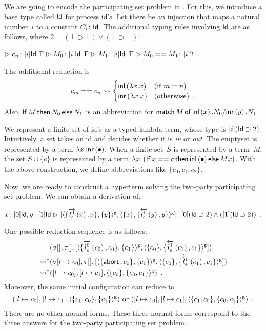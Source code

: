 {We are going to encode the participating set problem in \lgd.
For this, we introduce a base type called $\Id$ for process id's.
Let there be an injection that maps a natural number~$i$ to a constant
$C_i\colon\Id$.
The additional typing rules involving $\Id$ are as follows, where $2 = (\bot\supset\bot)\vee(\bot\supset\bot)$:
\begin{center}
 \UnaryRule{}{}
 {$\tr \tj{c_n}{[i]\Id}$}
 \hfill
 \BinaryRule
 {$\Gamma\tr \tj{M_0}[i]\Id$}
 {$\Gamma\tr \tj{M_1}[i]\Id$}
 {}
 {$\Gamma \tr \tj{\compare{M_0}{M_1}}{[i]2}$}\enspace.
\end{center}
The additional reduction is
\[
 c_m == c_n \reduce
\begin{cases}
 \linl{\lambda x.x}& (\text{if } m = n)\\
 \linr{\lambda x.x}& (\text{otherwise})\enspace.
\end{cases}
\]
Also,
${\ifte M {N_0} {N_1}}$
is an abbreviation for
${\lmat M x {N_0} y {N_1}}$.

We represent a finite set of id's as a
typed lambda term, whose type is $[i](\Id\supset 2)$.  Intuitively, a
set takes an id and decides whether it is \textit{in} or \textit{out}.
The emptyset is represented by a term $\lambda x. \linr {\bullet}$.
When a finite set~$S$ is represented by a term~$M$,
the set $S \cup \{c\}$ is represented by a term
$\lambda x.\left(\ifte{x==c}{\linl {\bullet}}{Mx}\right)$.
With the above construction, we define abbreviations
like $\{c_0, c_1, c_2\}$.

Now, we are ready to construct a hyperterm solving the two-party
participating set problem.
We can  obtain a derivation of:
\begin{center}
 \small
$
 \tj{x}{[0]\Id},
 \tj{y}{[1]\Id}
 \tr
 \tj{\cotuple{\gpair{\{\ltor 0 l \epsilon x, x\}, \{y\}},
 \gpair{\{x\}, \{\rtol 1 l\epsilon y, y\}}
 }}
 {[0](\Id\supset 2)\wedge ([1](\Id\supset 2))}\enspace.$
\end{center}

One possible reduction sequence is as follows:
\begin{align*}
 & \conf{[]}{[]}
 {\cotuple{\gpair{\{\ltor 0 l \epsilon {c_0}, {c_0}\}, \{{c_1}\}},
 \gpair {\{{c_0}\}, \{\rtol 1 l\epsilon {c_1}, {c_1}\}}}} \\
 \reduction &
 \conf{[l\mapsto {c_0}]}{[]}
 {
 \cotuple{
 \gpair{\{\abort, {c_0}\}, \{{c_1}\}},
 \gpair{\{{c_0}\}, \{\rtol 1 l\epsilon {c_1}, {c_1}\}}
 }
 }
 \\
 \reduction &
 \concreteconf{[l\mapsto {c_0}]}{[l\mapsto {c_1}]}{\gpair{\{{c_0}\}, \{c_0, c_1\}}}\enspace.
\end{align*}
Moreover, the same initial configuration can reduce to
\[
 \concreteconf{[l\mapsto c_0]}{[l\mapsto c_1]}{\gpair{\{c_1,c_0\},
 \{c_1\}}}\text{ or }
 \concreteconf{[l\mapsto c_0]}{[l\mapsto c_1]}{\gpair{\{c_1,c_0\},
 \{c_0, c_1\}}}\enspace.
\]
There are no other normal forms.
These three normal forms correspond to the three answers for the
two-party participating set problem.

}

